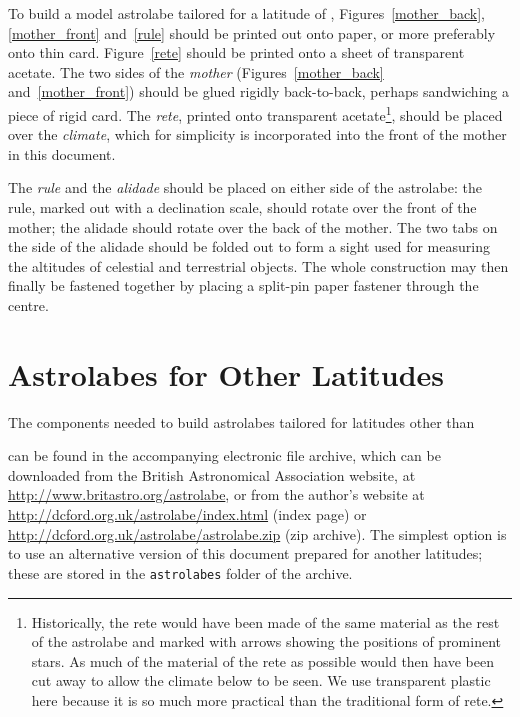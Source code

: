 \documentclass[a4paper,onecolumn,10pt]{article}
\begin{document}
To build a model astrolabe tailored for a latitude of
,
Figures~\ref{mother_back}, \ref{mother_front} and~\ref{rule} should be printed
out onto paper, or more preferably onto thin card.  Figure~\ref{rete} should be
printed onto a sheet of transparent acetate.  The two sides of the {\it mother}
(Figures~\ref{mother_back} and~\ref{mother_front}) should be glued rigidly
back-to-back, perhaps sandwiching a piece of rigid card. The {\it rete},
printed onto transparent acetate\footnote{Historically, the rete would have
been made of the same material as the rest of the astrolabe and marked with
arrows showing the positions of prominent stars. As much of the material of the
rete as possible would then have been cut away to allow the climate below to
be seen. We use transparent plastic here because it is so much more practical
than the traditional form of rete.}, should be placed over the {\it climate},
which for simplicity is incorporated into the front of the mother in this
document.

The {\it rule} and the {\it alidade} should be placed on either side of the
astrolabe: the rule, marked out with a declination scale, should rotate over
the front of the mother; the alidade should rotate over the back of the mother.
The two tabs on the side of the alidade should be folded out to form a sight
used for measuring the altitudes of celestial and terrestrial objects.  The
whole construction may then finally be fastened together by placing a split-pin
paper fastener through the centre.

\section*{Astrolabes for Other Latitudes}

The components needed to build astrolabes tailored for latitudes other than

can be found in the accompanying electronic file archive, which can be
downloaded from the British Astronomical Association website, at
\vspace{1mm}\newline\noindent
\url{http://www.britastro.org/astrolabe},
or from the author's website at
\vspace{1mm}\newline\noindent
\url{http://dcford.org.uk/astrolabe/index.html} (index page)
or
\vspace{1mm}\newline\noindent
\url{http://dcford.org.uk/astrolabe/astrolabe.zip} (zip archive).
\vspace{1mm}\newline\noindent
The simplest option is to use an alternative version of this document prepared
for another latitudes; these are stored in the {\tt astrolabes} folder of the
archive.
\end{document}
